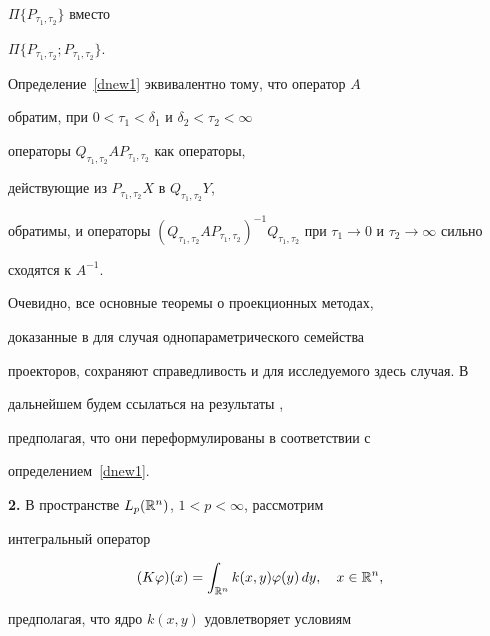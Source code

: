 $\Pi\{P_{\tau_1,\tau_2}\}$ вместо


$\Pi\{P_{\tau_1,\tau_2};P_{\tau_1,\tau_2}\}$.





Определение~\ref{dnew1} эквивалентно тому, что оператор $A$


обратим, при $0<\tau_1<\delta_1$ и $\delta_2<\tau_2<\infty$


операторы $Q_{\tau_1,\tau_2}AP_{\tau_1,\tau_2}$ как операторы,


действующие из $P_{\tau_1,\tau_2}X$ в $Q_{\tau_1,\tau_2}Y$,


обратимы, и операторы $(Q_{\tau_1,\tau_2}AP_{\tau_1,\tau_2})^{-1}


Q_{\tau_1,\tau_2}$ при $\tau_1\to 0$ и $\tau_2\to \infty$ сильно


сходятся к $A^{-1}$.





Очевидно, все основные теоремы о проекционных методах,


доказанные в \cite{b1} для случая однопараметрического семейства


проекторов, сохраняют справедливость и для исследуемого здесь случая. В


дальнейшем будем ссылаться на результаты \cite{b1},


предполагая, что они переформулированы в соответствии с


определением~\ref{dnew1}.


\medskip





{\bf 2.} В пространстве $L_p(\Bbb R^n)$, $1<p<\infty$, рассмотрим


интегральный оператор


\begin{equation}


(K\varphi)(x)=\int_{\Bbb R^n} k(x,y)\varphi(y)\,dy,\quad


x\in\Bbb R^n,


\label{new1}


\end{equation}


предполагая, что ядро $k(x,y)$ удовлетворяет условиям


